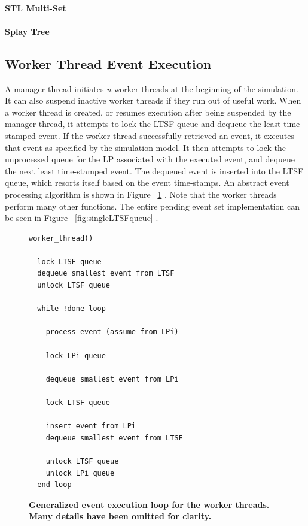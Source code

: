 \documentclass[11pt]{book}
\begin{document}
\paragraph{STL Multi-Set}


\paragraph{Splay Tree}

\subsection{Worker Thread Event Execution}

A manager thread initiates \emph{n} worker threads at the beginning of the simulation.
It can also suspend inactive worker threads if they run out of useful work.  When a worker
thread is created, or resumes execution after being suspended by the manager thread, it
attempts to lock the LTSF queue and dequeue the least time-stamped event.  If the worker
thread successfully retrieved an event, it executes that event as specified by the
simulation model.  It then attempts to lock the unprocessed queue for the LP associated
with the executed event, and dequeue the next least time-stamped event.  The dequeued
event is inserted into the LTSF queue, which resorts itself based on the event
time-stamps.  An abstract event processing algorithm is shown in Figure
~\ref{workerThreadAlgorithm} \cite{dickman}.  Note that the worker threads perform many
other functions.  The entire pending event set implementation can be seen in Figure
~\ref{fig:singleLTSFqueue} \cite{dickman}.

\linespread{1.0}
\begin{figure}
\begin{verbatim}
worker_thread()

  lock LTSF queue
  dequeue smallest event from LTSF
  unlock LTSF queue

  while !done loop

    process event (assume from LPi)

    lock LPi queue 

    dequeue smallest event from LPi

    lock LTSF queue

    insert event from LPi
    dequeue smallest event from LTSF

    unlock LTSF queue
    unlock LPi queue
  end loop
\end{verbatim}
\caption{\textbf{Generalized event execution loop for the worker threads.  Many details
    have been omitted for clarity.}}\label{workerThreadAlgorithm}
\end{figure}
\end{document}
